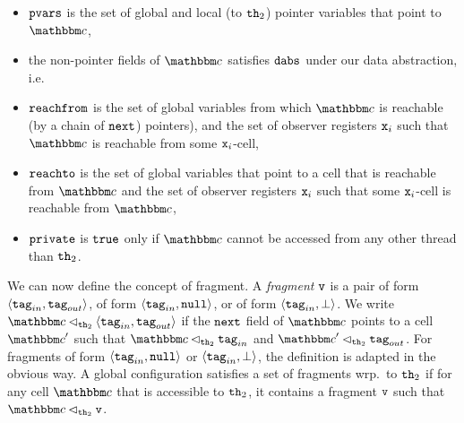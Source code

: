 \begin{itemize}
\item
  $\mathtt{pvars}$ is the set of global and local (to ${\tt th}_2$)
  pointer variables that point to $\cell$,
\item
the non-pointer fields of $\cell$ satisfies $\mathtt{dabs}$ under our data abstraction, i.e.
\item $\mathtt{reachfrom}$ is the set of global variables from which $\cell$ is 
  reachable (by a chain of ${\tt next}$) pointers), and the set of
  observer registers $\mathtt{x}_i$ such that $\cell$ is reachable from some $\mathtt{x}_i$-cell,
\item $\mathtt{reachto}$ is the set of global variables that point to a cell that
  is reachable from $\cell$ and  the set of
  observer registers $\mathtt{x}_i$ such that some $\mathtt{x}_i$-cell is reachable from $\cell$,
\item $\mathtt{private}$ is ${\tt true}$ only if $\cell$ cannot be accessed from any
  other thread than ${\tt th}_2$.
\end{itemize}

We can now define the concept of fragment.
A {\em fragment} $\mathtt{v}$ is a pair of form $\left\langle\mathtt{tag}_{in},\mathtt{tag}_{out}\right\rangle$, 
of form $\left\langle\mathtt{tag}_{in},{\tt null}\right\rangle$, or 
of form $\left\langle\mathtt{tag}_{in},\bot\right\rangle$.
We write  
$\cell \satfrag{{\thread_2}} \tuple{\inputtag,\outputtag}$ if
the ${\tt next}$ field of $\cell$ points to a cell $\cell'$ such that
$\cell \satfrag{{\thread_2}} \inputtag$ and
$\cell' \satfrag{{\thread_2}} \outputtag$.
For fragments of form $\left\langle\mathtt{tag}_{in},{\tt null}\right\rangle$ 
or $\left\langle\mathtt{tag}_{in},\bot\right\rangle$, the definition is adapted in the obvious way.
A global configuration satisfies a set of fragments wrp.\ to ${\tt th}_2$ if
for any cell $\cell$ that is accessible to ${\tt th}_2$, it contains a fragment
$\mathtt{v}$ such that $\cell \satfrag{{\thread_2}} \frag$.

